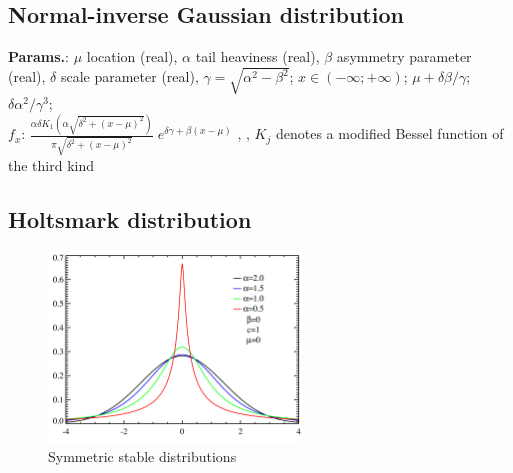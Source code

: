     
        
\subsection{Normal-inverse Gaussian distribution}





    {\color{darkblue} \textbf{Params.}:} {$\mu$ location (real),  $\alpha$ tail heaviness (real),  $\beta$ asymmetry parameter (real),  $\delta$ scale parameter (real),  $\gamma = \sqrt{\alpha^2 - \beta^2}$}; {$x \in (-\infty; +\infty)\!$}; {$\mu + \delta \beta / \gamma$}; {$\delta\alpha^2/\gamma^3$};\hspace{0.5cm}\\{\color{darkblue} \textbf{$f_x$}:} {$\frac{\alpha\delta K_1 \left(\alpha\sqrt{\delta^2 + (x - \mu)^2}\right)}{\pi \sqrt{\delta^2 + (x - \mu)^2}} \; e^{\delta \gamma + \beta (x - \mu)}$ , ,  $K_j$ denotes a modified Bessel function of the third kind}



    
        
\subsection{Holtsmark distribution}


    \begin{figure}[H]
        \centering
        \includegraphics[width=0.6\textwidth]{images/Levy distributionPDF.png}
        \caption{Symmetric stable distributions}
    \end{figure}




